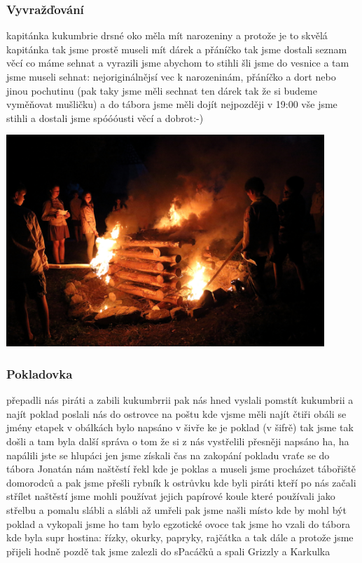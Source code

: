 

\subsubsection{Vyvražďování} %
\label{ssub:vyvražďování}

kapitánka kukumbrie drsné oko měla mít narozeniny a protože je to skvělá kapitánka tak jsme prostě museli mít dárek a přáníčko tak jsme dostali seznam věcí co máme sehnat a vyrazili jsme abychom to stihli šli jsme do vesnice a tam jsme museli sehnat: nejoriginálnějsí vec k narozeninám, přáníčko a dort nebo jinou pochutinu (pak taky jsme měli sechnat ten dárek tak že si budeme vyměňovat mušličku) a do tábora jsme měli dojít nejpozději v 19:00 vše jsme stihli a dostali jsme spóóóusti věcí a dobrot:-)


\begin{center}
	\includegraphics[width=12cm]{img/anpetu_tabor/taborak.JPG}
\end{center}

\subsubsection{Pokladovka} %
\label{ssub:pokladovka}

přepadli nás piráti a zabili kukumbrrii pak nás hned vyslali pomstít kukumbrii a najít poklad poslali nás do ostrovce na poštu kde vjsme měli najít čtiři obáli se jmény etapek v obálkách bylo napsáno v šivře ke je poklad (v šifrě) tak jsme tak došli a tam byla další správa o tom že si z nás vystřelili přesněji napsáno ha, ha napálili jste se hlupáci jen jsme získali čas na zakopání pokladu vraťe se do tábora Jonatán nám naštěstí řekl kde je poklas a museli jsme procházet tábořiště domorodců a pak jsme přešli rybník k ostrůvku kde byli piráti kteří po nás začali střílet naštěstí jsme mohli používat jejich papírové koule které používali jako střelbu a pomalu slábli a slábli až umřeli pak jsme našli místo kde by mohl být poklad a vykopali jsme ho tam bylo egzotické ovoce tak jsme ho vzali do tábora kde byla supr hostina: řízky, okurky, papryky, rajčátka a tak dále a protože jsme přijeli hodně pozdě tak jsme zalezli do sPacáčků a spali Grizzly a Karkulka


